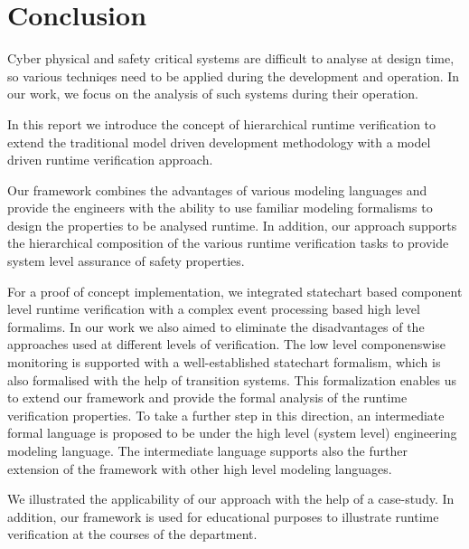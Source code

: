 \chapter{Conclusion}
\label{chap:conclusion}

Cyber physical and safety critical systems are difficult to analyse at design time, so various techniqes need to be applied during the development and operation. In our work, we focus on the analysis of such systems during their operation.

In this report we introduce the concept of hierarchical runtime verification to extend the traditional model driven development methodology with a model driven runtime verification approach.

Our framework combines the advantages of various modeling languages and provide the engineers with the ability to use familiar modeling formalisms to design the properties to be analysed runtime. In addition, our approach supports the hierarchical composition of the various runtime verification tasks to provide system level assurance of safety properties. 

For a proof of concept implementation, we integrated statechart based component level runtime verification with a complex event processing based high level formalims. In our work we also aimed to eliminate the disadvantages of the approaches used at different levels of verification. The low level componenswise monitoring is supported with a well-established statechart formalism, which is also formalised with the help of transition systems. This formalization enables us to extend our framework and provide the formal analysis of the runtime verification properties. To take a further step in this direction, an intermediate formal language is proposed to be under the high level (system level) engineering modeling language. The intermediate language supports also the further extension of the framework with other high level modeling languages. 

We illustrated the applicability of our approach with the help of a case-study. In addition, our framework is used for educational purposes to illustrate runtime verification at the courses of the department.